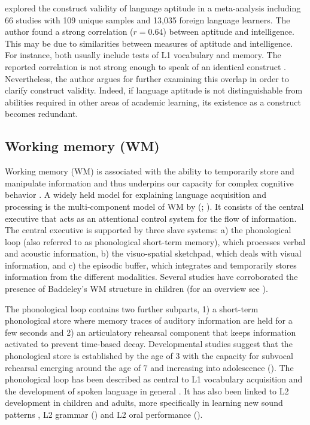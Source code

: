 \documentclass[output=paper]{langscibook}
\begin{document}
\citet{Li2016} explored the construct validity of language aptitude in a meta-ana\-ly\-sis including 66 studies with 109 unique samples and 13,035 foreign language learners. The author found a strong correlation ($r=0.64$) between aptitude and intelligence. This may be due to similarities between measures of aptitude and intelligence. For instance, both usually include tests of L1 vocabulary and memory. The reported correlation is not strong enough to speak of an identical construct \citep{Li2016}. Nevertheless, the author argues for further examining this overlap in order to clarify construct validity. Indeed, if language aptitude is not distinguishable from abilities required in other areas of academic learning, its existence as a construct becomes redundant. 

\subsection{Working memory (WM)} %

Working memory (WM) is associated with the ability to temporarily store and manipulate information and thus underpins our capacity for complex cognitive behavior \citep{Baddeley2003}. A widely held model for explaining language acquisition and processing is the multi-component model of WM by \citeauthor{BaddeleyHitch1974} (\citeyear{BaddeleyHitch1974}; \citealt{Baddeley2000}). It consists of the central executive that acts as an attentional control system for the flow of information. The central executive is supported by three slave systems: a) the phonological loop (also referred to as phonological short-term memory), which processes verbal and acoustic information, b) the visuo-spatial sketchpad, which deals with visual information, and c) the episodic buffer, which integrates and temporarily stores information from the different modalities. Several studies have corroborated the presence of Baddeley’s WM structure in children (for an overview see \citealt{BoyleEtAl2013}). 

The phonological loop contains two further subparts, 1) a short-term phonological store where memory traces of auditory information are held for a few seconds and 2) an articulatory rehearsal component that keeps information activated to prevent time-based decay. Developmental studies suggest that the phonological store is established by the age of 3 with the capacity for subvocal rehearsal emerging around the age of 7 and increasing into adolescence (\citealt{HasselhornGrube2003}). The phonological loop has been described as central to L1 vocabulary acquisition and the development of spoken language in general \citep{BaddeleyEtAl1998}. It has also been linked to L2 development in children and adults, more specifically in learning new sound patterns \citep{SpecialeEtAl2004}, L2 grammar (\citealt{FrenchOBrien2008}) and L2 oral performance (\citealt{OBrienEtAl2006}). 
\end{document}
